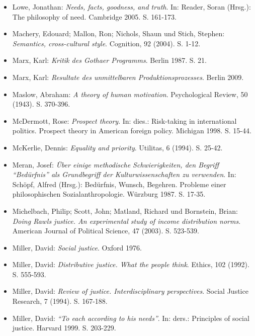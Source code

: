 \documentclass[a4paper]{thesis}
\begin{document}
\begin{itemize}[leftmargin=1.5em,label={},itemindent=-1.5em, itemsep=-1ex]
\item Lowe, Jonathan: \textit{Needs, facts, goodness, and truth}. In: Reader, Soran (Hrsg.): The philosophy of need. Cambridge 2005. S. 161-173.

\item Machery, Edouard; Mallon, Ron; Nichols, Shaun und Stich, Stephen: \textit{Semantics, cross-cultural style}. Cognition, 92 (2004). S. 1-12.

\item Marx, Karl: \textit{Kritik des Gothaer Programms}. Berlin 1987. S. 21.

\item Marx, Karl: \textit{Resultate des unmittelbaren Produktionsprozesses}. Berlin 2009.

\item Maslow, Abraham: \textit{A theory of human motivation}. Psychological Review, 50 (1943). S. 370-396.

\item McDermott, Rose: \textit{Prospect theory}. In: dies.: Risk-taking in international politics. Prospect theory in American foreign policy. Michigan 1998. S. 15-44.

\item McKerlie, Dennis: \textit{Equality and priority}. Utilitas, 6 (1994). S. 25-42.

\item Meran, Josef: \textit{Über einige methodische Schwierigkeiten, den Begriff \enquote{Bedürfnis} als Grundbegriff der Kulturwissenschaften zu verwenden}. In: Schöpf, Alfred (Hrsg.): Bedürfnis, Wunsch, Begehren. Probleme einer philosophischen Sozialanthropologie. Würzburg 1987. S. 17-35.

\item Michelbach, Philip; Scott, John; Matland, Richard und Bornstein, Brian: \textit{Doing Rawls justice. An experimental study of income distribution norms}. American Journal of Political Science, 47 (2003). S. 523-539.

\item Miller, David: \textit{Social justice}. Oxford 1976.

\item Miller, David: \textit{Distributive justice. What the people think}. Ethics, 102 (1992). S. 555-593.

\item Miller, David: \textit{Review of justice. Interdisciplinary perspectives}. Social Justice Research, 7 (1994). S. 167-188.

\item Miller, David: \textit{\enquote{To each according to his needs}}. In: ders.: Principles of social justice. Harvard 1999. S. 203-229.


\end{itemize}
\end{document}
